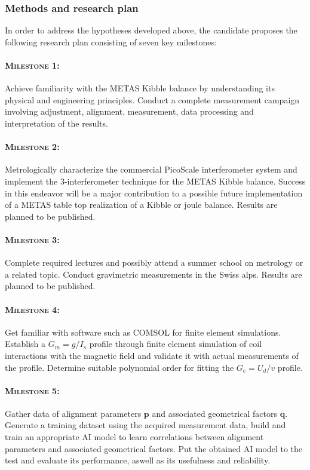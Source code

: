 \documentclass{article}
\newcommand\vect[1]{\ensuremath{\bm{#1}}}
\begin{document}
\subsubsection*{Methods and research plan}
In order to address the hypotheses developed above, the candidate proposes the following research plan consisting of seven key milestones:

\paragraph*{\normalfont \textsc{Milestone 1:}}
Achieve familiarity with the METAS Kibble balance by understanding its physical  and engineering principles. Conduct a complete measurement campaign involving adjustment, alignment, measurement, data processing and interpretation of the results.

\paragraph*{\normalfont \textsc{Milestone 2:}}
Metrologically characterize the commercial PicoScale interferometer system and implement the 3-interferometer technique for the METAS Kibble balance. Success in this endeavor will be a major contribution to a possible future implementation of a METAS table top realization of a Kibble or joule balance. Results are planned to be published.

\paragraph*{\normalfont \textsc{Milestone 3:}}
Complete required lectures and possibly attend a summer school on metrology or a related topic. Conduct gravimetric measurements in the Swiss alps. Results are planned to be published.

\paragraph*{\normalfont \textsc{Milestone 4:}}
Get familiar with software such as COMSOL for finite element simulations. Establish a $G_m = g/I_s$ profile through finite element simulation of coil interactions with the magnetic field and validate it with actual measurements of the profile. Determine suitable polynomial order for fitting the $G_e = U_d/v$ profile.

\paragraph*{\normalfont \textsc{Milestone 5:}}
Gather data of alignment parameters $\vect{p}$ and associated geometrical factors $\vect{q}$. Generate a training dataset using the acquired measurement data, build and train an appropriate AI model to learn correlations between alignment parameters and associated geometrical factors. Put the obtained AI model to the test and evaluate its performance, aswell as its usefulness and reliability.
\end{document}
